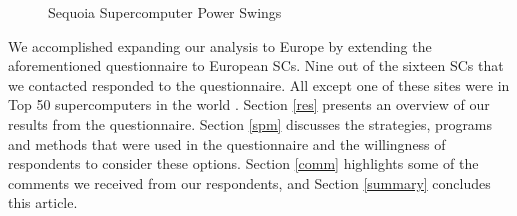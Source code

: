 \begin{figure}
\begin{center}
\caption{Sequoia Supercomputer Power Swings}
\label{fig:seq}
\end{center}
\end{figure}



We accomplished expanding our analysis to Europe by extending the aforementioned questionnaire to European SCs. Nine out of the sixteen SCs that we contacted responded to the questionnaire. All except one of these sites were in Top 50 supercomputers in the world \cite{Top500}. Section \ref{res} presents an overview of our results from the questionnaire. Section \ref{spm} discusses the strategies, programs and methods that were used in the questionnaire and the willingness of respondents to consider these options. Section \ref{comm} highlights some of the comments we received from our respondents, and Section \ref{summary} concludes this article.
